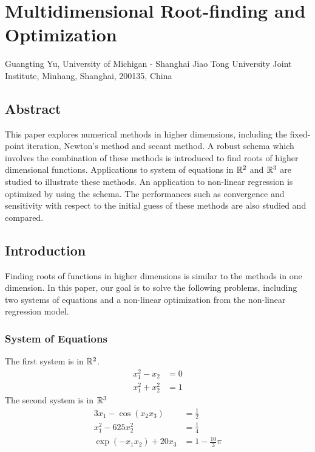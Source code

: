 \chapter{Multidimensional Root-finding and Optimization}
\begin{center}
Guangting Yu, University of Michigan - Shanghai Jiao Tong University Joint Institute, Minhang, Shanghai, 200135, China
\end{center}


\section*{Abstract}
This paper explores numerical methods in higher dimemsions, including the fixed-point iteration, Newton's method and secant method.
A robust schema which involves the combination of these methods is introduced to find roots of higher dimensional functions.
Applications to system of equations in \(\mathbb{R}^2\) and \(\mathbb{R}^3\) are studied to illustrate these methods.
An application to non-linear regression is optimized by using the schema.
The performances such as convergence and sensitivity with respect to the initial guess of these methods are also studied and compared.



\section{Introduction}
Finding roots of functions in higher dimensions is similar to the methods in one dimension.
In this paper, our goal is to solve the following problems, including two systems of equations and a non-linear optimization from the non-linear regression model.


\subsection{System of Equations}
The first system is in \(\mathbb{R}^2\).
\begin{equation}\label{eqn1}
\begin{aligned}
x_1^2-x_2&=0\\
x_1^2+x_2^2&=1
\end{aligned}
\end{equation}
The second system is in \(\mathbb{R}^3\)
\begin{equation}\label{eqn2}
\begin{aligned}
3x_1-\cos(x_2x_3)&=\frac{1}{2}\\
x_1^2-625x_2^2&=\frac{1}{4}\\
\exp(-x_1x_2)+20x_3&=1-\frac{10}{3}\pi
\end{aligned}
\end{equation}



